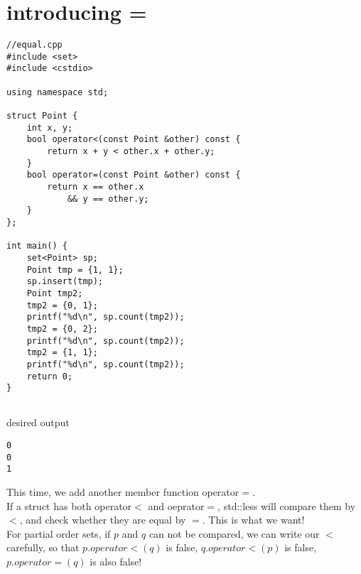\documentclass{article}
\begin{document}
\section{introducing =}
\begin{lstlisting}
//equal.cpp
#include <set>
#include <cstdio>

using namespace std;

struct Point {
    int x, y;
    bool operator<(const Point &other) const {
        return x + y < other.x + other.y;
    }
    bool operator=(const Point &other) const {
        return x == other.x
            && y == other.y;
    }
};

int main() {
    set<Point> sp;
    Point tmp = {1, 1};
    sp.insert(tmp);
    Point tmp2;
    tmp2 = {0, 1};
    printf("%d\n", sp.count(tmp2));
    tmp2 = {0, 2};
    printf("%d\n", sp.count(tmp2));
    tmp2 = {1, 1};
    printf("%d\n", sp.count(tmp2));
    return 0;
}


\end{lstlisting}
desired output
\begin{lstlisting}
0
0
1
\end{lstlisting}
This time, we add another member function operator$=$.\\
If a struct has both operator$<$ and oeprator$=$, std::less will compare them by $<$, and check whether they are equal by $=$. This is what we want!\\
For partial order sets, if $p$ and $q$ can not be compared, we can write our $<$ carefully, so that $p.operator<(q)$ is false, $q.operator<(p)$ is false, $p.operator=(q)$ is also false!
\newpage
\end{document}
